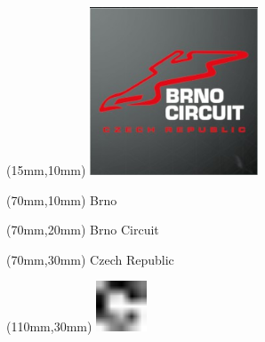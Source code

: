 \null\newpage
\begin{textblock*}{50mm}(15mm,10mm)%
\includegraphics[width=50mm]{LG/2015-05-20_00075.png}
\end{textblock*}
\begin{textblock*}{130mm}(70mm,10mm)%
{\fontsize{20}{20}\selectfont Brno}\\
\end{textblock*}
\begin{textblock*}{120mm}(70mm,20mm)%
{\fontsize{16}{16}\selectfont Brno Circuit}\\
\end{textblock*}
\begin{textblock*}{120mm}(70mm,30mm)%
{\fontsize{12}{12}\selectfont Czech Republic}
\end{textblock*}
\begin{textblock*}{30mm}(110mm,30mm)%
\centering
\includegraphics[height=15mm]{icons/fa-rotate-right.pdf}
\end{textblock*}
